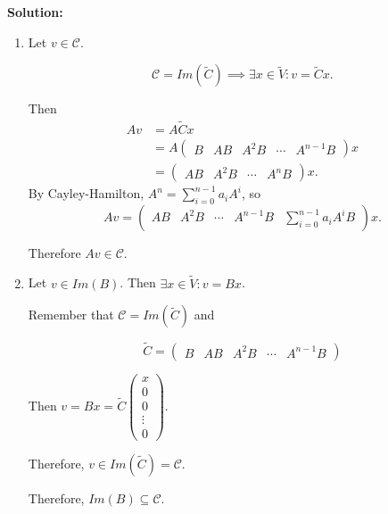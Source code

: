 \documentclass[12pt]{article}
\newenvironment{solution}{
    \textbf{Solution:}
    
}{
    
    \vspace{2em}
}
\begin{document}
\begin{solution}
    \begin{enumerate}[label=(\alph*)]
        \item 

        Let \(v \in \mathcal{C}\).

        \[
            \mathcal{C} = Im(\tilde{C}) \implies \exists x \in \tilde{V} : v = \tilde{C}x.
        \]

        Then 
        \[
            \begin{aligned}
                Av &= A\tilde{C}x \\
                &= A \begin{pmatrix}
                    B & AB & A^2B & \cdots & A^{n-1}B
                \end{pmatrix} x \\
                &= \begin{pmatrix}
                    AB & A^2B & \cdots & A^nB
                \end{pmatrix} x.
            \end{aligned}
        \]
        By Cayley-Hamilton, \(A^n = \sum_{i=0}^{n-1} a_i A^i\), so
        \[
            Av = \begin{pmatrix}
                AB & A^2B & \cdots & A^{n-1}B & \sum_{i=0}^{n-1} a_i A^{i}B
            \end{pmatrix} x.
        \]

        Therefore \(Av \in \mathcal{C}\).

        \item Let \(v \in Im(B)\). Then \(\exists x \in \tilde{V} : v = Bx\).

        Remember that \(\mathcal{C} = Im(\tilde{C})\) and

        \[
            \tilde{C} = \begin{pmatrix} B & AB & A^2B & \cdots & A^{n-1}B \end{pmatrix}
        \]

        Then \(v = Bx = \tilde{C}\begin{pmatrix} x \\ 0 \\ 0 \\ \vdots \\ 0 \end{pmatrix}\).

        Therefore, \(v \in Im(\tilde{C}) = \mathcal{C}\).

        Therefore, \(Im(B) \subseteq \mathcal{C}\).
    \end{enumerate}
\end{solution}
\end{document}
